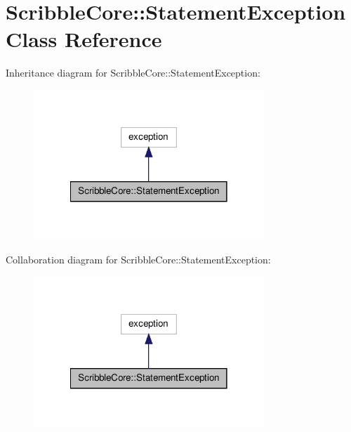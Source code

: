 \hypertarget{class_scribble_core_1_1_statement_exception}{\section{Scribble\-Core\-:\-:Statement\-Exception Class Reference}
\label{class_scribble_core_1_1_statement_exception}
}


Inheritance diagram for Scribble\-Core\-:\-:Statement\-Exception\-:\nopagebreak
\begin{figure}[H]
\begin{center}
\leavevmode
\includegraphics[width=246pt]{class_scribble_core_1_1_statement_exception__inherit__graph}
\end{center}
\end{figure}


Collaboration diagram for Scribble\-Core\-:\-:Statement\-Exception\-:\nopagebreak
\begin{figure}[H]
\begin{center}
\leavevmode
\includegraphics[width=246pt]{class_scribble_core_1_1_statement_exception__coll__graph}
\end{center}
\end{figure}

